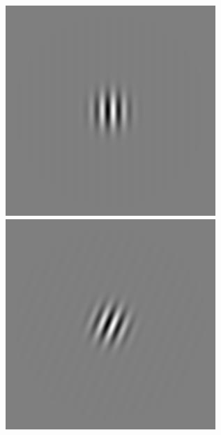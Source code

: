 \begin{figure}[ht]
\begin{center}
 \includegraphics[width=\columnwidth/9]{ch4/figures/iGabor3_0.jpg}
 \includegraphics[width=\columnwidth/9]{ch4/figures/iGabor3_1.jpg}

\end{center}
\end{figure}
